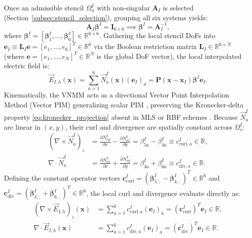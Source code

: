 \documentclass[VANCOUVER]{USG}
\begin{document}
Once an admissible stencil $\Omega_u^I$ with non-singular $\mathbf{A}_I$ is selected (Section~\ref{subsec:stencil_selection}), grouping all six systems yields:
\begin{equation}
    \mathbf{A}_I \boldsymbol{\beta}^I = \mathbf{I}_{6 \times 6} \implies \boldsymbol{\beta}^I = \mathbf{A}_I^{-1},
    \label{eq:beta_matrix_inversion}
\end{equation}
where $\boldsymbol{\beta}^I = [\boldsymbol{\beta}_1^I, \dots, \boldsymbol{\beta}_6^I] \in \mathbb{R}^{6 \times 6}$. Gathering the local stencil DoFs into $\mathbf{e}_I \equiv \mathbf{L}_I \mathbf{e} = [e_1, \dots, e_6]^T \in \mathbb{R}^6$ via the Boolean restriction matrix $\mathbf{L}_I \in \mathbb{R}^{6 \times N}$ (where $\mathbf{e} = [e_1, \dots, e_N]^T \in \mathbb{R}^N$ is the global DoF vector), the local interpolated electric field is:
\begin{equation}
    \vec{E}_{I,h}(\mathbf{x}) = \sum_{a=1}^6 \vec{N}_a^I(\mathbf{x}) (\mathbf{e}_I)_a = \mathbf{P}(\mathbf{x} - \mathbf{x}_I) \boldsymbol{\beta}^I \mathbf{e}_I.
    \label{eq:field_interpolation_mlpg}
\end{equation}
Kinematically, the VNMM acts as a directional Vector Point Interpolation Method (Vector PIM) generalizing scalar PIM \cite{liu2001point, liu2005introduction}, preserving the Kronecker-delta property \eqref{eq:kronecker_projection} absent in MLS or RBF schemes \cite{atluri2002meshless}. Because $\vec{N}_a^I$ are linear in $(x, y)$, their curl and divergence are spatially constant across $\Omega_s^I$:
\begin{align}
    (\nabla \times \vec{N}_a^I)_z & = \frac{\partial N_{ay}^I}{\partial x} - \frac{\partial N_{ax}^I}{\partial y} = \beta_{5a}^I - \beta_{4a}^I \equiv c_{\mathrm{curl}, a}^I \in \mathbb{R}, \label{eq:curl_constant} \\
    \nabla \cdot \vec{N}_a^I      & = \frac{\partial N_{ax}^I}{\partial x} + \frac{\partial N_{ay}^I}{\partial y} = \beta_{3a}^I + \beta_{6a}^I \equiv c_{\mathrm{div}, a}^I \in \mathbb{R}. \label{eq:div_constant}
\end{align}
Defining the constant operator vectors $\mathbf{c}_{\mathrm{curl}}^I = (\boldsymbol{\beta}_{5, :}^I - \boldsymbol{\beta}_{4, :}^I)^T \in \mathbb{R}^6$ and $\mathbf{c}_{\mathrm{div}}^I = (\boldsymbol{\beta}_{3, :}^I + \boldsymbol{\beta}_{6, :}^I)^T \in \mathbb{R}^6$, the local curl and divergence evaluate directly as:
\begin{align}
    (\nabla \times \vec{E}_{I,h})_z(\mathbf{x}) & = \sum_{a=1}^6 c_{\mathrm{curl}, a}^I (\mathbf{e}_I)_a = (\mathbf{c}_{\mathrm{curl}}^I)^T \mathbf{e}_I \in \mathbb{R}, \label{eq:field_curl_constant} \\
    \nabla \cdot \vec{E}_{I,h}(\mathbf{x})      & = \sum_{a=1}^6 c_{\mathrm{div}, a}^I (\mathbf{e}_I)_a = (\mathbf{c}_{\mathrm{div}}^I)^T \mathbf{e}_I \in \mathbb{R}. \label{eq:field_div_constant}
\end{align}
\end{document}
